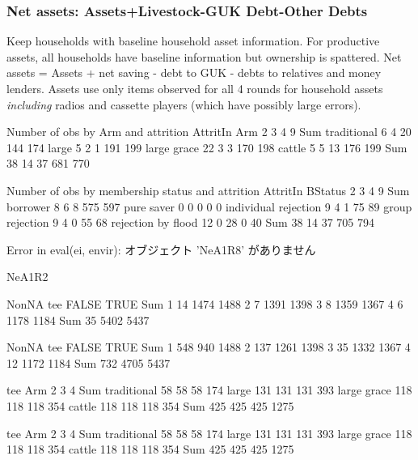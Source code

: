 \subsubsection{Net assets: Assets+Livestock-GUK Debt-Other Debts}

Keep households with baseline household asset information. For productive assets, all households have baseline information but ownership is spattered. Net assets = Assets + net saving - debt to GUK - debts to relatives and money lenders. Assets use only items observed for all 4 rounds for household assets \textit{including} radios and cassette players (which have possibly large errors). 


\begin{Schunk}
\begin{Soutput}


Number of obs by Arm and attrition
             AttritIn
Arm             2   3   4   9 Sum
  traditional   6   4  20 144 174
  large         5   2   1 191 199
  large grace  22   3   3 170 198
  cattle        5   5  13 176 199
  Sum          38  14  37 681 770


Number of obs by membership status and attrition
                      AttritIn
BStatus                  2   3   4   9 Sum
  borrower               8   6   8 575 597
  pure saver             0   0   0   0   0
  individual rejection   9   4   1  75  89
  group rejection        9   4   0  55  68
  rejection by flood    12   0  28   0  40
  Sum                   38  14  37 705 794
\end{Soutput}
\begin{Soutput}
Error in eval(ei, envir):  オブジェクト 'NeA1R8' がありません 
\end{Soutput}
\end{Schunk}


\begin{Schunk}
\begin{Soutput}
NeA1R2
\end{Soutput}
\begin{Soutput}
     NonNA
tee   FALSE TRUE  Sum
  1      14 1474 1488
  2       7 1391 1398
  3       8 1359 1367
  4       6 1178 1184
  Sum    35 5402 5437
\end{Soutput}
\begin{Soutput}
     NonNA
tee   FALSE TRUE  Sum
  1     548  940 1488
  2     137 1261 1398
  3      35 1332 1367
  4      12 1172 1184
  Sum   732 4705 5437
\end{Soutput}
\begin{Soutput}
             tee
Arm              2    3    4  Sum
  traditional   58   58   58  174
  large        131  131  131  393
  large grace  118  118  118  354
  cattle       118  118  118  354
  Sum          425  425  425 1275
\end{Soutput}
\begin{Soutput}
             tee
Arm              2    3    4  Sum
  traditional   58   58   58  174
  large        131  131  131  393
  large grace  118  118  118  354
  cattle       118  118  118  354
  Sum          425  425  425 1275
\end{Soutput}
\end{Schunk}

